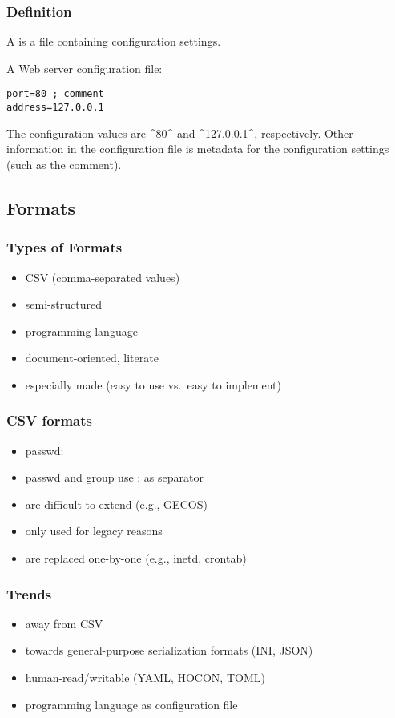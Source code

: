 \documentclass{beamer}
\begin{document}
\begin{frame}[fragile]
	\frametitle{Definition}
	A  is a file containing configuration settings.

	\pause
	A Web server configuration file:

\begin{lstlisting}
port=80 ; comment
address=127.0.0.1\end{lstlisting}

	\pause

	The configuration values are ^80^ and ^127.0.0.1^, respectively.
	Other information in the configuration file is metadata for the configuration settings (such as the comment).
\end{frame}

\subsection{Formats}

\begin{frame}
	\frametitle{Types of Formats}
	\begin{itemize}
	\item CSV (comma-separated values)
	\item semi-structured
	\item programming language
	\item document-oriented, literate
	\item especially made (easy to use vs.\ easy to implement)
	\end{itemize}
\end{frame}

\begin{frame}
	\frametitle{CSV formats}
	\begin{itemize}
	\item passwd: 
	\item passwd and group use : as separator
	\item are difficult to extend (e.g., GECOS)
	\item only used for legacy reasons
	\item are replaced one-by-one (e.g., inetd, crontab)
	\end{itemize}
\end{frame}

\begin{frame}
	\frametitle{Trends}
	\begin{itemize}
	\item away from CSV
	\item towards general-purpose serialization formats (INI, JSON)
	\item human-read/writable (YAML, HOCON, TOML)
	\item programming language as configuration file
	\end{itemize}
\end{frame}
\end{document}
